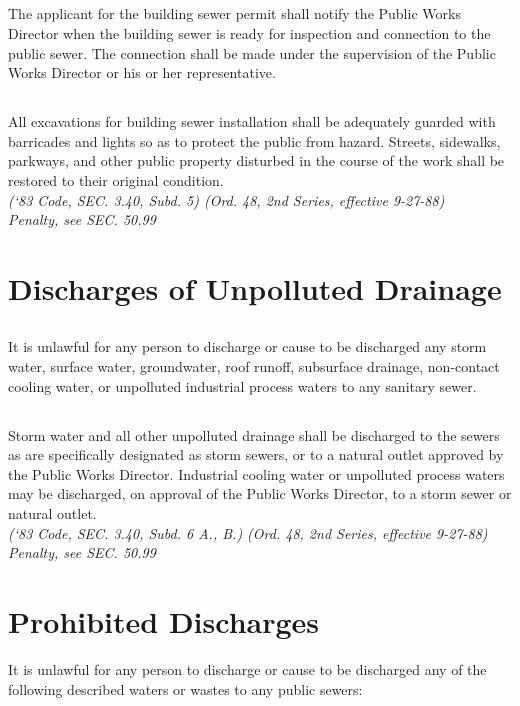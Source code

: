 \subsection{}
The applicant for the building sewer permit shall notify the Public Works Director when the building sewer is ready for inspection and connection to the public sewer.  The connection shall be made under the supervision of the Public Works Director or his or her representative.
\subsection{}
All excavations for building sewer installation shall be adequately guarded with barricades and lights so as to protect the public from hazard.  Streets, sidewalks, parkways, and other public property disturbed in the course of the work shall be restored to their original condition.\\
\emph{(‘83 Code, SEC. 3.40, Subd. 5) (Ord. 48, 2nd Series, effective 9-27-88)}\\
\emph{Penalty, see SEC. 50.99}
\section{Discharges of Unpolluted Drainage}
\subsection{}
It is unlawful for any person to discharge or cause to be discharged any storm water, surface water, groundwater, roof runoff, subsurface drainage, non-contact cooling water, or unpolluted industrial process waters to any sanitary sewer.
\subsection{}
Storm water and all other unpolluted drainage shall be discharged to the sewers as are specifically designated as storm sewers, or to a natural outlet approved by the Public Works Director.  Industrial cooling water or unpolluted process waters may be discharged, on approval of the Public Works Director, to a storm sewer or natural outlet.\\
\emph{(‘83 Code, SEC. 3.40, Subd. 6 A., B.) (Ord. 48, 2nd Series, effective 9-27-88)}\\
\emph{Penalty, see SEC. 50.99}
\section{Prohibited Discharges}
It is unlawful for any person to discharge or cause to be discharged any of the following described waters or wastes to any public sewers:
